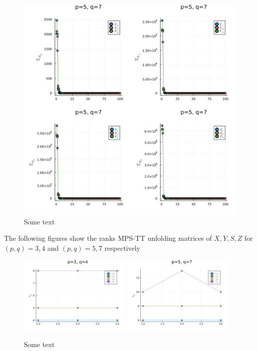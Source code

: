\documentclass[a4paper]{article}
\begin{document}
\begin{figure}[H]
    \centering
    \includegraphics[width=\textwidth]{./plots/sigma_57.png}
    \caption{Some text}
\end{figure}

The following figures show the ranks MPS-TT unfolding matrices of $X, Y, S,
Z$ for $(p, q) = 3,4$ and $(p, q) = 5,7$ respectively

\begin{figure}[H]
    \centering
    \includegraphics[width=0.48\textwidth]{./plots/rank_34.png}
    \includegraphics[width=0.48\textwidth]{./plots/rank_57.png}
    \caption{Some text}
\end{figure}
\nocite{code}
\printbibliography
\end{document}
